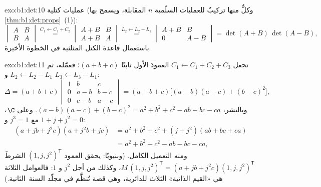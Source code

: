 \begin{solution}{exo:b1:det:10}
عمليات كتلية (وكلٌّ منها تركيبٌ للعمليات السلّمية $n$
المقابلة، ويسمح بها \cref{thm:b1:det:props}~(1)):
\[
\begin{vmatrix} A & B\\ B & A\end{vmatrix}
\overset{C_1 \leftarrow C_1 + C_2}{=}
\begin{vmatrix} A + B & B\\ A + B & A\end{vmatrix}
\overset{L_2 \leftarrow L_2 - L_1}{=}
\begin{vmatrix} A + B & B\\ 0 & A - B\end{vmatrix}
= \det(A+B)\,\det(A-B),
\]
باستعمال قاعدة الكتل المثلثية في الخطوة الأخيرة.
\end{solution}

\begin{solution}{exo:b1:det:11}
تجعل $C_1 \leftarrow C_1 + C_2 + C_3$ العمودَ الأول ثابتًا
$(a + b + c)$؛ فعمّله، ثم $L_2 \leftarrow L_2 - L_1$ و
$L_3 \leftarrow L_3 - L_1$:
\[
\Delta = (a+b+c)\begin{vmatrix}
1 & b & c\\
0 & a - b & b - c\\
0 & c - b & a - c
\end{vmatrix}
= (a+b+c)\bigl[(a-b)(a-c) + (b-c)^2\bigr],
\]
وبالنشر، $(a-b)(a-c) + (b-c)^2 = a^2 + b^2 + c^2 - ab - bc
- ca$. وعلى $\C$، مع $j^3 = 1$ و $1 + j + j^2 = 0$:
\begin{align*}
(a + jb + j^2c)(a + j^2b + jc)
&= a^2 + b^2 + c^2 + (j + j^2)(ab + bc + ca)\\
&= a^2 + b^2 + c^2 - ab - bc - ca ,
\end{align*}
ومنه التعميل الكامل. (وبنيويًا: يحقق العمود
$(1, j, j^2)^{\mathsf T}$ الشرطَ $M\,(1, j, j^2)^{\mathsf T}
= (a + jb + j^2c)(1, j, j^2)^{\mathsf T}$، وكذلك من أجل
$j^2$ و $1$: فالعوامل الثلاثة هي «القيم الذاتية» الثلاث
للدائرية، وهي قصة تُنظَّم في مجلّد السنة~الثانية.)
\end{solution}

